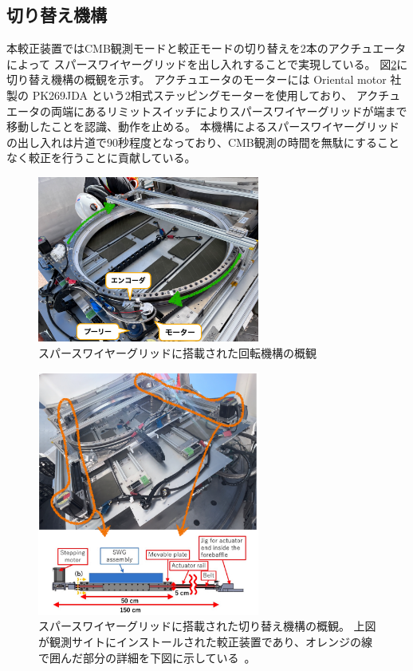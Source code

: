 \documentclass[../../main.tex]{subfiles}
\begin{document}
\subsection{切り替え機構}
本較正装置ではCMB観測モードと較正モードの切り替えを2本のアクチュエータによって
スパースワイヤーグリッドを出し入れすることで実現している。
図\ref{fig:gridloader}に切り替え機構の概観を示す。
アクチュエータのモーターには Oriental motor 社製の PK269JDA という2相式ステッピングモーターを使用しており、
アクチュエータの両端にあるリミットスイッチによりスパースワイヤーグリッドが端まで移動したことを認識、動作を止める。
本機構によるスパースワイヤーグリッドの出し入れは片道で$90$秒程度となっており、CMB観測の時間を無駄にすることなく較正を行うことに貢献している\cite{swg:nakata}。
\begin{figure}[H]
    \centering
    \includegraphics[width=0.65\textwidth]{wiregrid/rotation_parts.pdf}
    \caption{スパースワイヤーグリッドに搭載された回転機構の概観}
    \label{fig:rotation_parts}
\end{figure}
\begin{figure}[H]
    \centering
    \includegraphics[width=0.65\textwidth]{wiregrid/wiregrid_actuator.pdf}
    \caption[スパースワイヤーグリッドに搭載された切り替え機構の概観]{スパースワイヤーグリッドに搭載された切り替え機構の概観。
    上図が観測サイトにインストールされた較正装置であり、オレンジの線で囲んだ部分の詳細を下図に示している~\cite{swg:Murata_2023}。}
    \label{fig:gridloader}
\end{figure}
\end{document}
